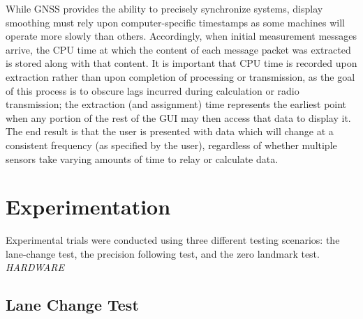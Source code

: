\documentclass[twocolumn,10pt]{article}
\begin{document}
    While GNSS provides the ability to precisely synchronize systems, display smoothing must rely upon computer-specific timestamps as some machines will operate more slowly than others. Accordingly, when initial measurement messages arrive, the CPU time at which the content of each message packet was extracted is stored along with that content. It is important that CPU time is recorded upon extraction rather than upon completion of processing or transmission, as the goal of this process is to obscure lags incurred during calculation or radio transmission; the extraction (and assignment) time represents the earliest point when any portion of the rest of the GUI may then access that data to display it. The end result is that the user is presented with data which will change at a consistent frequency (as specified by the user), regardless of whether multiple sensors take varying amounts of time to relay or calculate data.





\section*{Experimentation} \label{sec:exper}

  Experimental trials were conducted using three different testing scenarios: the lane-change test, the precision following test, and the zero landmark test.  
  \textit{ HARDWARE}

  \subsection*{Lane Change Test}
\end{document}
